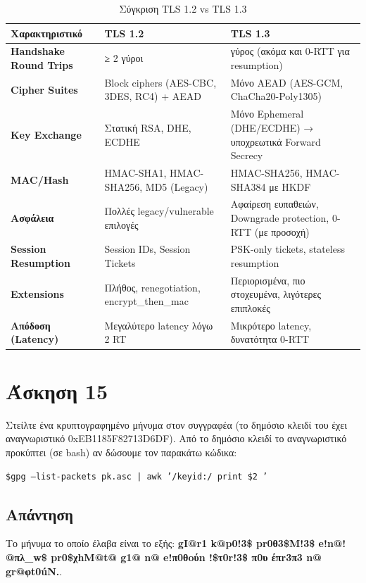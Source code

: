 \documentclass[12pt]{article}
\begin{document}
\begin{table}[ht]
  \centering
  \small  
  \begin{tabularx}{\textwidth}{|>{\raggedright\arraybackslash}p{3cm}|%
                              >{\raggedright\arraybackslash}X|%
                              >{\raggedright\arraybackslash}X|}
    \hline
    \textbf{Χαρακτηριστικό} & \textbf{TLS 1.2} & \textbf{TLS 1.3} \\
    \hline
    \textbf{Handshake Round Trips} 
      & ≥ 2 γύροι 
      & 1 γύρος (ακόμα και 0-RTT για resumption) \\
    \hline
    \textbf{Cipher Suites} 
      & Block ciphers (AES-CBC, 3DES, RC4) + AEAD 
      & Μόνο AEAD (AES-GCM, ChaCha20-Poly1305) \\
    \hline
    \textbf{Key Exchange} 
      & Στατική RSA, DHE, ECDHE 
      & Μόνο Ephemeral (DHE/ECDHE) → υποχρεωτικά Forward Secrecy \\
    \hline
    \textbf{MAC/Hash} 
      & HMAC-SHA1, HMAC-SHA256, MD5 (Legacy) 
      & HMAC-SHA256, HMAC-SHA384 με HKDF \\
    \hline
    \textbf{Ασφάλεια} 
      & Πολλές legacy/vulnerable επιλογές 
      & Αφαίρεση ευπαθειών, Downgrade protection, 0-RTT (με προσοχή) \\
    \hline
    \textbf{Session Resumption} 
      & Session IDs, Session Tickets 
      & PSK-only tickets, stateless resumption \\
    \hline
    \textbf{Extensions} 
      & Πλήθος, renegotiation, encrypt\_then\_mac 
      & Περιορισμένα, πιο στοχευμένα, λιγότερες επιπλοκές \\
    \hline
    \textbf{Απόδοση (Latency)} 
      & Μεγαλύτερο latency λόγω 2 RT 
      & Μικρότερο latency, δυνατότητα 0-RTT \\
    \hline
  \end{tabularx}
  \caption{Σύγκριση TLS 1.2 vs TLS 1.3}
  \label{tab:tls_comparison}
\end{table}

\hfill \blacksquare

\section*{Άσκηση 15}

Στείλτε ένα κρυπτογραφημένο μήνυμα στον συγγραφέα (το δημόσιο κλειδί του έχει αναγνωριστικό 0xEB1185F82713D6DF). Από το δημόσιο κλειδί το αναγνωριστικό προκύπτει (σε bash) αν δώσουμε τον παρακάτω κώδικα:

\texttt{\$gpg --list-packets pk.asc | awk '/keyid:/{ print \$2 }'}
\subsection*{Απάντηση}

Το μήνυμα το οποίο έλαβα είναι το εξής: \textbf{gI@r1 k@p0!3\$ pr0θ3\$M!3\$ e!n@! @πλ\_w\$ pr0\$χhM@t@ g1@ n@ e!π0θoύn !\$τ0r!3\$ π0υ έπr3π3 n@ gr@φt0úN.}.

\hfill \blacksquare
\end{document}
